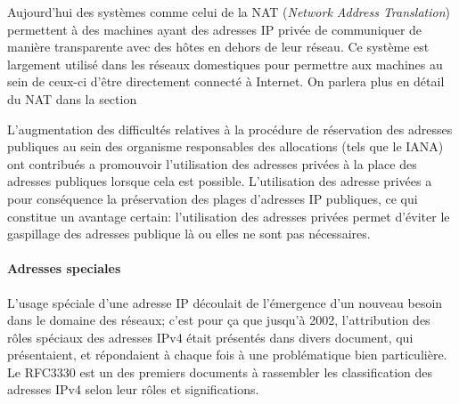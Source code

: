 Aujourd'hui des systèmes comme celui de la NAT ({\it Network Address
Translation}) permettent à des machines ayant des adresses IP privée de communiquer
de manière transparente avec des hôtes en dehors de leur réseau. Ce système est
largement utilisé dans les réseaux domestiques pour permettre aux machines au
sein de ceux-ci d'être directement connecté à Internet. On parlera plus en
détail du NAT dans la section %
\smallbreak


 
L'augmentation des difficultés relatives à la procédure de réservation des adresses
publiques au sein des organisme responsables des allocations\cite{url-RFC-1918}
(tels que le IANA) ont contribués a promouvoir l'utilisation des adresses privées à la place
 des adresses publiques lorsque cela est possible.
L'utilisation des adresse privées a pour conséquence la préservation des plages
d'adresses IP publiques, ce qui constitue un avantage certain: l'utilisation
des adresses privées permet d'éviter le gaspillage des adresses publique là ou elles
ne sont pas nécessaires.


\paragraph{Adresses speciales}
L'usage spéciale d'une adresse IP découlait de l'émergence
d'un nouveau besoin dans le domaine des réseaux; c'est pour
ça que jusqu'à 2002, l'attribution des rôles spéciaux des adresses
IPv4 était présentés dans divers document, qui présentaient, et répondaient à chaque fois à une
problématique bien particulière. Le RFC3330 est un des premiers documents à
rassembler les classification des adresses IPv4 selon leur rôles et significations.


